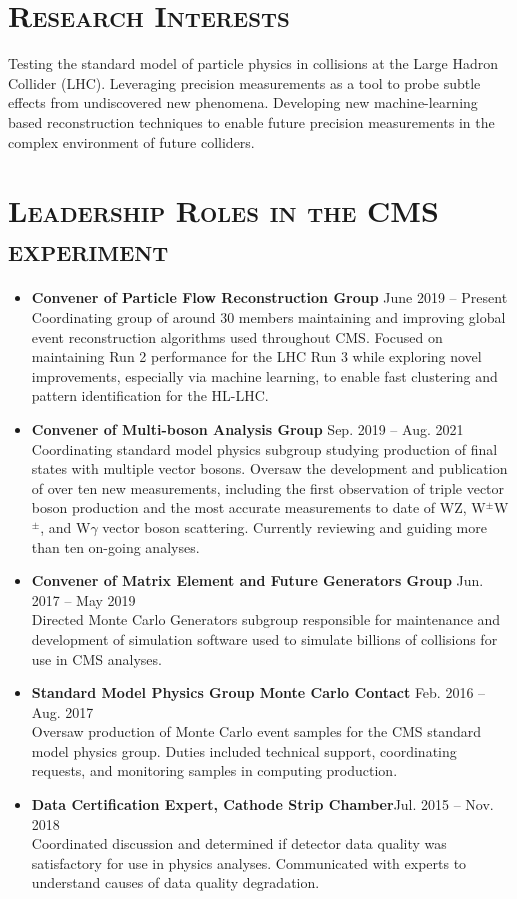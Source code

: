\documentclass[10pt]{res} %
\begin{document}
\begin{resume}
\section{\textsc{Research Interests}}
Testing the standard model of particle physics in collisions at the Large Hadron Collider (LHC). 
Leveraging precision measurements as a tool to probe subtle effects from undiscovered new phenomena. 
Developing new machine-learning based reconstruction techniques to enable future precision measurements in the 
complex environment of future colliders.

\section{\textsc{Leadership Roles in the CMS experiment}}
\begin{itemize}
\item{\textbf{Convener of Particle Flow Reconstruction Group} \hfill{June 2019 -- Present}} \\
    Coordinating group of around 30 members maintaining and improving global event reconstruction algorithms
    used throughout CMS. Focused on maintaining Run 2 performance for the LHC Run 3 while exploring
    novel improvements, especially via machine learning, to enable fast clustering and pattern identification
    for the HL-LHC.
\item{\textbf{Convener of Multi-boson Analysis Group} \hfill{Sep. 2019 -- Aug. 2021}} \\
    Coordinating standard model physics subgroup studying production of final states
    with multiple vector bosons. Oversaw the development and publication of over ten new measurements, 
    including the first observation of triple vector boson production and the most accurate measurements 
    to date of WZ, W$^{\pm}$W$^{\pm}$, and W$\gamma$ vector boson scattering. Currently reviewing and guiding
    more than ten on-going analyses.
\item{\textbf{Convener of Matrix Element and Future Generators Group} \hfill{Jun. 2017 -- May 2019}}\\
    Directed Monte Carlo Generators subgroup 
    responsible for maintenance and development of simulation software used to simulate
    billions of collisions for use in CMS analyses.
\item{\textbf{Standard Model Physics Group Monte Carlo Contact} \hfill{Feb. 2016 -- Aug. 2017}} \\
    Oversaw
    production of Monte Carlo event samples for the CMS standard model physics group. 
    Duties included technical support, coordinating requests, and monitoring samples in computing production.
\item{\textbf{ Data Certification Expert, Cathode Strip Chamber}\hfill{Jul. 2015 -- Nov. 2018}} \\
    Coordinated discussion and determined if
    detector data quality was satisfactory for use in physics analyses.
    Communicated with experts to understand
    causes of data quality degradation.
\end{itemize}


\end{resume}
\end{document}

